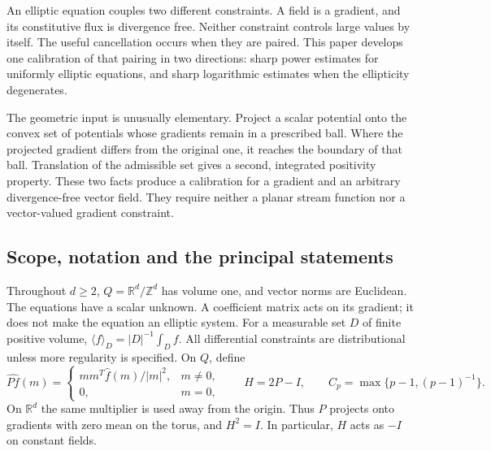 \documentclass[11pt,a4paper]{article}
\numberwithin{equation}{section}
\theoremstyle{definition}
\theoremstyle{remark}\newtheorem{remark}[theorem]{Remark}
\newcommand{\R}{\mathbb R}
\newcommand{\Z}{\mathbb Z}
\newcommand{\Id}{I}
\newcommand{\mean}[2]{\langle #1\rangle_{#2}}
\begin{document}
An elliptic equation couples two different constraints. A field is a gradient,
and its constitutive flux is divergence free. Neither constraint controls
large values by itself. The useful cancellation occurs when they are paired.
This paper develops one calibration of that pairing in two directions:
sharp power estimates for uniformly elliptic equations, and sharp
logarithmic estimates when the ellipticity degenerates.

The geometric input is unusually elementary. Project a scalar potential onto
the convex set of potentials whose gradients remain in a prescribed ball.
Where the projected gradient differs from the original one, it reaches the
boundary of that ball. Translation of the admissible set gives a second,
integrated positivity property. These two facts produce a calibration for a
gradient and an arbitrary divergence-free vector field. They require neither
a planar stream function nor a vector-valued gradient constraint.

\subsection{Scope, notation and the principal statements}

Throughout \(d\geq2\), \(Q=\R^d/\Z^d\) has volume one, and vector norms are
Euclidean. The equations have a scalar unknown. A coefficient matrix acts on
its gradient; it does not make the equation an elliptic system.
For a measurable set \(D\) of finite positive volume,
\(\mean fD=|D|^{-1}\int_D f\).
All differential constraints are distributional unless more regularity is
specified. On \(Q\), define
\begin{equation}\label{eq:projection-symbol}
 \widehat{Pf}(m)=
 \begin{cases}mm^T\widehat f(m)/|m|^2,&m\ne0,\\0,&m=0,\end{cases}
 \qquad H=2P-\Id,\qquad
 C_p=\max\{p-1,(p-1)^{-1}\}.
\end{equation}
On \(\R^d\) the same multiplier is used away from the origin. Thus \(P\)
projects onto gradients with zero mean on the torus, and \(H^2=\Id\).
In particular, \(H\) acts as \(-\Id\) on constant fields.
\end{document}
